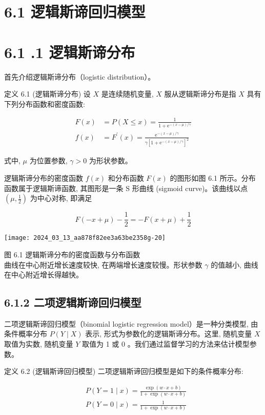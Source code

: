 \documentclass[10pt]{article}
\begin{document}
\begin{CJK*}{UTF8}{bsmi}
\section*{6.1 逻辑斯谛回归模型}
\section*{6.1 .1 逻辑斯谛分布}
首先介绍逻辑斯谛分布（logistic distribution）。

定义 6.1 (逻辑斯谛分布) 设 $X$ 是连续随机变量, $X$ 服从逻辑斯谛分布是指 $X$ 具有下列分布函数和密度函数:


\begin{align*}
F(x) & =P(X \leqslant x)=\frac{1}{1+\mathrm{e}^{-(x-\mu) / \gamma}}  \tag{6.1}\\
f(x) & =F^{\prime}(x)=\frac{\mathrm{e}^{-(x-\mu) / \gamma}}{\gamma\left[1+\mathrm{e}^{-(x-\mu) / \gamma}\right]^{2}} \tag{6.2}
\end{align*}


式中, $\mu$ 为位置参数, $\gamma>0$ 为形状参数。

逻辑斯谛分布的密度函数 $f(x)$ 和分布函数 $F(x)$ 的图形如图 6.1 所示。分布函数属于逻辑斯谛函数, 其图形是一条 $\mathrm{S}$ 形曲线 (sigmoid curve)。该曲线以点 $\left(\mu, \frac{1}{2}\right)$ 为中心对称, 即满足

$$
F(-x+\mu)-\frac{1}{2}=-F(x+\mu)+\frac{1}{2}
$$

\begin{center}
\texttt{[image: 2024\_03\_13\_aa878f82ee3a63be2358g-20]}
\end{center}

图 6.1 逻辑斯谛分布的密度函数与分布函数\\
曲线在中心附近增长速度较快, 在两端增长速度较慢。形状参数 $\gamma$ 的值越小, 曲线在中心附近增长得越快。

\subsection*{6.1.2 二项逻辑斯谛回归模型}
二项逻辑斯谛回归模型（binomial logistic regression model）是一种分类模型, 由条件概率分布 $P(Y \mid X)$ 表示, 形式为参数化的逻辑斯谛分布。这里, 随机变量 $X$ 取值为实数, 随机变量 $Y$ 取值为 1 或 0 。我们通过监督学习的方法来估计模型参数。

定义 6.2 (逻辑斯谛回归模型) 二项逻辑斯谛回归模型是如下的条件概率分布:


\begin{align*}
& P(Y=1 \mid x)=\frac{\exp (w \cdot x+b)}{1+\exp (w \cdot x+b)}  \tag{6.3}\\
& P(Y=0 \mid x)=\frac{1}{1+\exp (w \cdot x+b)} \tag{6.4}
\end{align*}



\end{CJK*}
\end{document}
